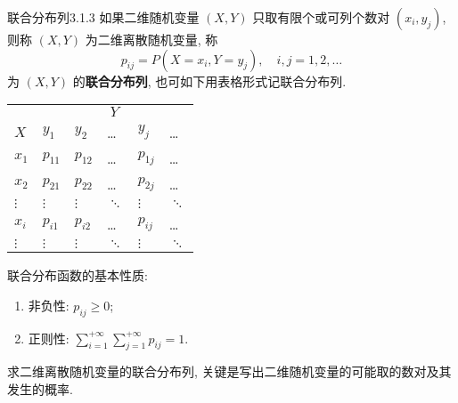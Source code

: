    \begin{definition}{联合分布列}{3.1.3}
		如果二维随机变量 $(X,Y)$ 只取有限个或可列个数对 $(x_i,y_j)$, 则称 $(X,Y)$ 为二维离散随机变量, 称
    \begin{equation}\label{eq:3.1.2}
     	p_{i j}=P\left(X=x_{i}, Y=y_{j}\right), \quad i, j=1,2, \ldots
    \end{equation}
   	为 $(X,Y)$ 的\textbf{联合分布列}, 也可如下用表格形式记联合分布列.
   \end{definition}
   \begin{center}
   		\begin{tabularx}{0.8\textwidth}{ZZZZZZ}
   		\toprule
   		 &  \\
   		 $X$	&	$y_1$&	$y_2$&	\ldots&	$y_j$& \ldots	\\
   		 \midrule 
   		 $x_1$& $p_{11}$ & $p_{12}$ & \ldots & $p_{1j}$ & \ldots \\
   		 \midrule 
   		 $x_2$& $p_{21}$ & $p_{22}$ & \ldots & $p_{2j}$ & \ldots \\
   		 \midrule 
   		 $\vdots$& $\vdots$ & $\vdots$ & $\ddots$ & $\vdots$ & $\ddots$ \\
   		 \midrule 
   		$x_i$ & $p_{i1}$ & $p_{i2}$ & \ldots & $p_{ij}$  & \ldots \\
   		\midrule 
   		 $\vdots$& $\vdots$ & $\vdots$ & $\ddots$ & $\vdots$ & $\ddots$ \\
   		 \bottomrule
   		\end{tabularx} 
   \end{center}
   联合分布函数的基本性质:
   \begin{enumerate}
   	\item 非负性: $p_{ij}\geq 0$;
   	\item 正则性: $\sum_{i=1}^{+\infty}\sum_{j=1}^{+\infty}p_{ij}=1$.
   \end{enumerate}
   求二维离散随机变量的联合分布列, 关键是写出二维随机变量的可能取的数对及其发生的概率.

